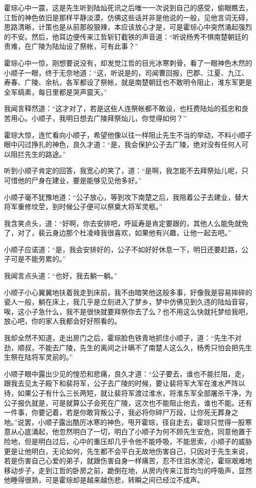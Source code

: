 霍琮心中一震，这是先生听到陆灿死讯之后唯一一次说到自己的感受，偷眼瞧去，江哲的神色依旧是那样平静淡漠，仿佛这些话并非是他说的一般，见他言词无碍，思路清晰，计策也是从前那般狠辣，本应该放心才是，可是霍琮心中突然涌起强烈的不安。然后，他耳边便传来江哲斩钉截铁的声音道：“听说杨秀不惧南楚朝廷的责难，在广陵为陆灿设了祭帐，可有此事？”

霍琮心中一惊，刚想要说没有，却发觉江哲的目光冰寒刺骨，看了一眼神色木然的小顺子一眼，终于无奈地道：“这，听说是的，司闻曹回报，巴郡、江夏、九江、寿春、广陵、余杭，各军都设了祭帐，就是南楚朝廷也不敢明令阻止，淮东军更是全军缟素，每日里都是哭声震天。”

我闻言释然道：“这才对了，若是这些人连祭帐都不敢设，也枉费陆灿的孤忠和良苦用心。小顺子，我明日想去广陵拜祭灿儿，你觉得如何？”

霍琮大惊，连忙看向小顺子，希望他像以往一样阻止先生不当的举动，不料小顺子眼中闪过挣扎的神色，良久才道：“是，我会保护公子去广陵，绝对没有任何人可以阻拦先生的路途。”

听到小顺子肯定的回答，我宽心的笑了，道：“是啊，我怎能不去拜祭灿儿呢，只可惜他的尸身在建业，要是能够见见他多好。”

小顺子毫不犹豫地道：“公子放心，等到攻下南楚之后，我陪着公子去建业，替大将军重修坟茔，到时候公子便可以祭奠大将军灵柩。”

我含笑点头，道：“好啊，你去安排吧，呼延寿是肯定要跟的，其他人么能免就免了，对了，裴云身边那个杜凌峰我很喜欢，如果他有兴趣，让他一起去吧。”

小顺子应诺道：“是，我会安排好的，公子不如好好休息一下，明日还要赶路，公子可是不能劳累的。”

我闻言点头道：“也好，我去躺一躺。”

小顺子小心翼翼地扶着我走到床前，我不由暗笑他这般多事，好像我是容易摔碎的瓷人一般，躺在床上，我几乎是立刻进入了梦乡，梦中仿佛见到久违的陆灿音容，唉，这小子急什么，我不是很快就要拜祭你去了么？也不用这么快就托梦给我吧，放心吧，你的家人我都会好好照看的。

我却全然不知道，走出房门之后，霍琮脸色铁青地抓住小顺子，道：“先生不对劲，顺叔，不能去广陵，先生的离间之计瞒不了南楚人这么久，杨秀只怕会把先生生祭在陆将军灵前的。”

小顺子眼中露出少见的惶恐和悲痛，良久才道：“公子要去，谁也不能拦阻，走，跟我去见太子殿下和裴将军，公子去广陵的时候，要让裴将军大军在淮水严阵以待，如果公子有什么三长两短，就让裴将军渡过淮水，将淮东军全部屠杀干净，为公子报仇就是，可是就算公子会死在广陵，这次也不能阻止他去，谁也不能。还有一件事，你要记着，若是你敢背叛公子，我必将你碎尸万段，让你死无葬身之地。”说罢，小顺子露出酷厉冰寒的神色，甩开霍琮，径自走去，霍琮只觉得一股寒意从心底涌起，他忽然明白了一切，明白了小顺子为何不顾先生安危，同意他置于险地，但是明白过后，心中的重压却几乎令他不能呼吸，不能思索，小顺子的威胁更是让他明白，无论如何，先生都不会平白无故地伤害自己，只因对于先生来说，若是伤害自己心爱的弟子，就跟伤害自身一样痛苦，忍不住泪水滂沦，霍琮艰难地移动步子，走到江哲的卧房之前，跪倒在地，从房内传来江哲均匀的呼吸声，显然他睡得很熟，可是霍琮却是越来越伤悲，转瞬之间已经泣不成声。


